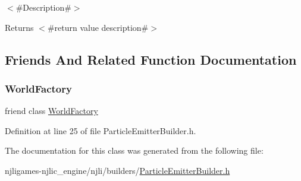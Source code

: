$<$\#\+Description\#$>$

\begin{DoxyReturn}{Returns}
$<$\#return value description\#$>$ 
\end{DoxyReturn}


\subsection{Friends And Related Function Documentation}
\mbox{\label{classnjli_1_1_particle_emitter_builder_acb96ebb09abe8f2a37a915a842babfac}} 
\subsubsection{\texorpdfstring{World\+Factory}{WorldFactory}}
{\footnotesize\ttfamily friend class \mbox{\hyperlink{classnjli_1_1_world_factory}{World\+Factory}}\hspace{0.3cm}{\ttfamily [friend]}}



Definition at line 25 of file Particle\+Emitter\+Builder.\+h.



The documentation for this class was generated from the following file\+:\begin{DoxyCompactItemize}
\item 
njligames-\/njlic\+\_\+engine/njli/builders/\mbox{\hyperlink{_particle_emitter_builder_8h}{Particle\+Emitter\+Builder.\+h}}\end{DoxyCompactItemize}
